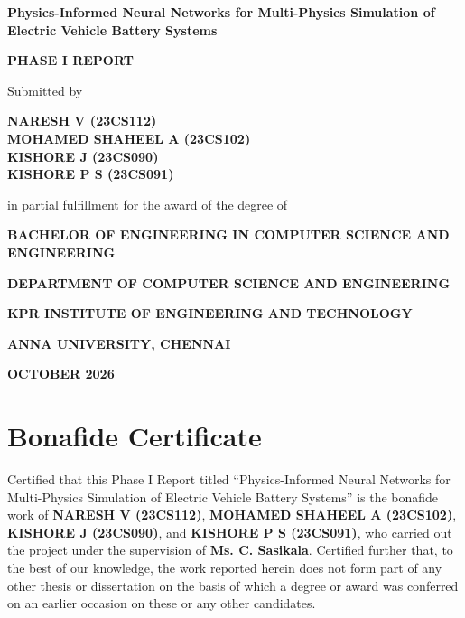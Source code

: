 \documentclass[14pt,a4paper,oneside]{extreport}
\newcommand{\projecttitle}{Physics-Informed Neural Networks for Multi-Physics Simulation of Electric Vehicle Battery Systems}
\newcommand{\degree}{Bachelor of Engineering in Computer Science and Engineering}
\begin{document}
\justifying
{}
\setcounter{page}{1}

\begin{titlepage}
\thispagestyle{empty}
\begin{center}
\vspace*{1.0cm}
{\bfseries\fontsize{18}{22}\selectfont \projecttitle\par}
\vspace{1.2cm}
{\bfseries\fontsize{16}{19}\selectfont PHASE I REPORT\par}
\vspace{1.0cm}
{\fontsize{14}{18}\selectfont Submitted by\par}
\vspace{0.5cm}
{\bfseries
NARESH V (23CS112)\\
MOHAMED SHAHEEL A (23CS102)\\
KISHORE J (23CS090)\\
KISHORE P S (23CS091)\par}
\vspace{0.9cm}
{in partial fulfillment for the award of the degree of\par}
\vspace{0.4cm}
{\bfseries\MakeUppercase{\degree}\par}
\vfill
{\bfseries DEPARTMENT OF COMPUTER SCIENCE AND ENGINEERING\par}
\vspace{0.3cm}
{\bfseries KPR INSTITUTE OF ENGINEERING AND TECHNOLOGY\par}
{\bfseries ANNA UNIVERSITY, CHENNAI\par}
\vspace{0.8cm}
{\bfseries OCTOBER 2026\par}
\end{center}
\end{titlepage}

\setcounter{page}{2}
\clearpage
\chapter*{Bonafide Certificate}
\thispagestyle{plain}
Certified that this Phase I Report titled ``\projecttitle'' is the bonafide work of \textbf{NARESH V (23CS112)}, \textbf{MOHAMED SHAHEEL A (23CS102)}, \textbf{KISHORE J (23CS090)}, and \textbf{KISHORE P S (23CS091)}, who carried out the project under the supervision of \textbf{Ms. C. Sasikala}. Certified further that, to the best of our knowledge, the work reported herein does not form part of any other thesis or dissertation on the basis of which a degree or award was conferred on an earlier occasion on these or any other candidates.
\end{document}
